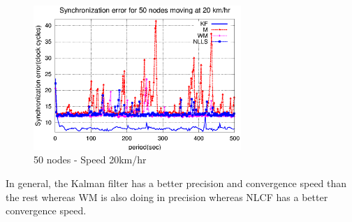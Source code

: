 \documentclass[a4paper,10pt]{report}
\begin{document}
\begin{figure}
\centering
\includegraphics[width=0.7\textwidth]{50output-s20}
\caption{50 nodes - Speed 20km/hr} \label{50output20}
\end{figure}
In general, the Kalman filter has a better precision and convergence
speed than the rest whereas WM is also doing in precision whereas
NLCF has a better convergence speed.
\end{document}
